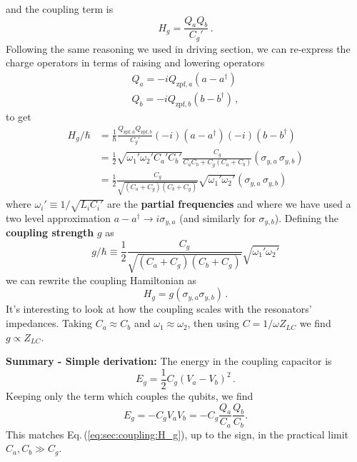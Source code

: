 and the coupling term is
\begin{equation}
  H_g = \frac{ Q_a Q_b} {C_g'} \, . \label{eq:sec:coupling:H_g}
\end{equation}
Following the same reasoning we used in driving section, we can re-express the charge operators in terms of raising and lowering operators
\begin{align}
  Q_a = -i Q_{\text{zpf}, a} (a - a^{\dagger}) \nonumber \\
  Q_b = -i Q_{\text{zpf}, b} (b - b^{\dagger}) \nonumber \, ,
\end{align}
to get
\begin{align*}
  H_g / \hbar
  &= \frac{1}{\hbar} \frac{Q_{\text{zpf},a}Q_{\text{zpf},b}}{C_g'}
    (-i)(a - a^\dagger) (-i)(b - b^\dagger) \\
  &= \frac{1}{2} \sqrt{\omega_1' \omega_2' C_a' C_b'}
    \frac{C_g}{C_a C_b + C_g(C_a + C_b)} (\sigma_{y,a} \, \sigma_{y,b}) \\
  &= \frac{1}{2}\frac{C_g}{\sqrt{(C_a + C_g) (C_b + C_g)}}
    \sqrt{\omega_1' \omega_2'} (\sigma_{y,a} \, \sigma_{y,b})
\end{align*}
where $\omega_i' \equiv 1 / \sqrt{L_i C_i'}$ are the \textbf{partial frequencies} and where we have used a two level approximation \mbox{$a - a^\dagger \rightarrow i \sigma_{y,a}$} (and similarly for $\sigma_{y, b}$).
Defining the \textbf{coupling strength} $g$ as
\begin{equation}
  g/\hbar \equiv \frac{1}{2} \frac{C_g}{\sqrt{(C_a + C_g) (C_b + C_g)}} \sqrt{\omega_1' \omega_2'}
\end{equation}
we can rewrite the coupling Hamiltonian as
\begin{equation}
  H_g = g \left( \sigma_{y,a} \sigma_{y,b} \right) \, .
\end{equation}
It's interesting to look at how the coupling scales with the resonators' impedances.
Taking $C_a \approx C_b$ and $\omega_1 \approx \omega_2$, then using $C = 1 / \omega Z_{LC}$ we find $g \propto Z_{LC}$.

\textbf{Summary - Simple derivation:} The energy in the coupling capacitor is
\begin{equation*}
  E_g = \frac{1}{2} C_g \left( V_a - V_b \right)^2 \, .
\end{equation*}
Keeping only the term which couples the qubits, we find
\begin{equation}
  E_g = -C_g V_a V_b = -C_g \frac{Q_a}{C_a} \frac{Q_b}{C_b} .
\end{equation}
This matches Eq.\,(\ref{eq:sec:coupling:H_g}), up to the sign, in the practical limit $C_a,C_b \gg C_g$.

